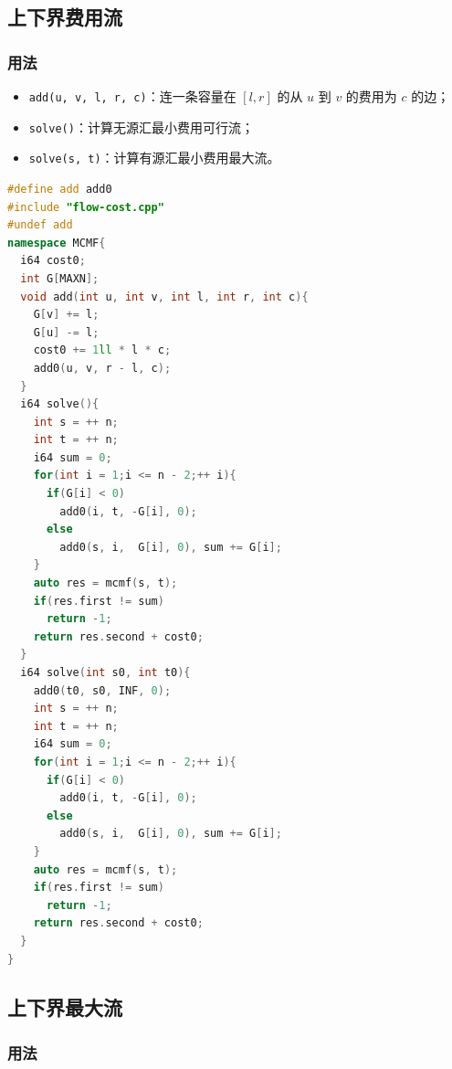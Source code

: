 \documentclass[10pt]{ctexart}
\providecommand{\tightlist}{\setlength{\itemsep}{0pt}\setlength{\parskip}{0pt}}
\newcommand{\passthrough}[1]{#1}
\begin{document}
\begin{multicols}{3}
    \subsection{上下界费用流}\label{ux4e0aux4e0bux754cux8d39ux7528ux6d41}

    \subsubsection{用法}\label{ux7528ux6cd5-3}

    \begin{itemize}
    \tightlist
    \item
      \passthrough{\lstinline!add(u, v, l, r, c)!}：连一条容量在
      \([l, r]\) 的从 \(u\) 到 \(v\) 的费用为 \(c\) 的边；
    \item
      \passthrough{\lstinline!solve()!}：计算无源汇最小费用可行流；
    \item
      \passthrough{\lstinline!solve(s, t)!}：计算有源汇最小费用最大流。
    \end{itemize}

\begin{lstlisting}[language={C++}]
#define add add0
#include "flow-cost.cpp"
#undef add
namespace MCMF{
  i64 cost0;
  int G[MAXN];
  void add(int u, int v, int l, int r, int c){
    G[v] += l;
    G[u] -= l;
    cost0 += 1ll * l * c;
    add0(u, v, r - l, c);
  }
  i64 solve(){
    int s = ++ n;
    int t = ++ n;
    i64 sum = 0;
    for(int i = 1;i <= n - 2;++ i){
      if(G[i] < 0)
        add0(i, t, -G[i], 0);
      else
        add0(s, i,  G[i], 0), sum += G[i];
    }
    auto res = mcmf(s, t);
    if(res.first != sum)
      return -1;
    return res.second + cost0;
  }
  i64 solve(int s0, int t0){
    add0(t0, s0, INF, 0);
    int s = ++ n;
    int t = ++ n;
    i64 sum = 0;
    for(int i = 1;i <= n - 2;++ i){
      if(G[i] < 0)
        add0(i, t, -G[i], 0);
      else
        add0(s, i,  G[i], 0), sum += G[i];
    }
    auto res = mcmf(s, t);
    if(res.first != sum)
      return -1;
    return res.second + cost0;
  }
}
\end{lstlisting}

    \subsection{上下界最大流}\label{ux4e0aux4e0bux754cux6700ux5927ux6d41}

    \subsubsection{用法}\label{ux7528ux6cd5-4}


\end{multicols}
\end{document}
